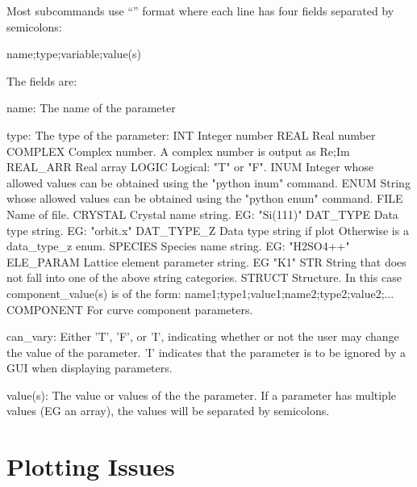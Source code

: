 Most  subcommands use ``'' format where each line has four fields
separated by semicolons:
\begin{example}
  {name};{type};{variable};{value(s)}
\end{example}
The fields are:
\begin{example}
    name:       The name of the parameter

    type:       The type of the parameter:
        INT           Integer number
        REAL          Real number
        COMPLEX       Complex number. A complex number is output as Re;Im
        REAL_ARR      Real array
        LOGIC         Logical: "T" or "F".
        INUM          Integer whose allowed values can be obtained 
                        using the "python inum" command.
        ENUM          String whose allowed values can be obtained 
                        using the "python enum" command.
        FILE          Name of file.
        CRYSTAL       Crystal name string. EG: "Si(111)"
        DAT_TYPE      Data type string. EG: "orbit.x"
        DAT_TYPE_Z    Data type string if plot%
                        Otherwise is a data_type_z enum.
        SPECIES       Species name string. EG: "H2SO4++"
        ELE_PARAM     Lattice element parameter string. EG "K1"
        STR           String that does not fall into one of the above string categories.
        STRUCT        Structure. In this case {component_value(s)} is of the form:
                        {name1};{type1};{value1};{name2};{type2};{value2};...
        COMPONENT     For curve component parameters.

    can_vary:   Either 'T', 'F', or 'I', indicating whether or not the
                user may change the value of the parameter. 'I' indicates
                that the parameter is to be ignored by a GUI when displaying parameters.

    value(s):   The value or values of the the parameter. If a parameter has multiple
                values (EG an array), the values will be separated by semicolons.
\end{example}

\section{Plotting Issues}
\label{s:gui.plot}

